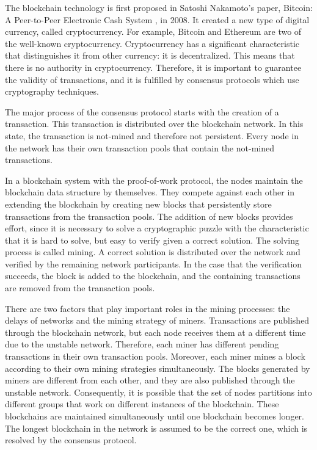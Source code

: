 The blockchain technology is first proposed in Satoshi Nakamoto’s paper, Bitcoin: A Peer-to-Peer Electronic Cash System \cite{Nakamoto2008}, in 2008. It created a new type of digital currency, called cryptocurrency. For example, Bitcoin \cite{bitcoin} and Ethereum \cite{ethereum} are two of the well-known cryptocurrency. Cryptocurrency has a significant characteristic that distinguishes it from other currency: it is decentralized. This means that there is no authority in cryptocurrency. Therefore, it is important to guarantee the validity of transactions, and it is fulfilled by consensus protocols which use cryptography techniques. \cite{Narayanan2016}

The major process of the consensus protocol starts with the creation of a transaction. This transaction is distributed over the blockchain network. In this state, the transaction is not-mined and therefore not persistent. Every node in the network has their own transaction pools that contain the not-mined transactions.

In a blockchain system with the proof-of-work protocol, the nodes maintain the blockchain data structure by themselves. They compete against each other in extending the blockchain by creating new blocks that persistently store transactions from the transaction pools. The addition of new blocks provides effort, since it is necessary to solve a cryptographic puzzle with the characteristic that it is hard to solve, but easy to verify given a correct solution. The solving process is called mining. A correct solution is distributed over the network and verified by the remaining network participants. In the case that the verification succeeds, the block is added to the blockchain, and the containing transactions are removed from the transaction pools.

There are two factors that play important roles in the mining processes: the delays of networks and the mining strategy of miners. Transactions are published through the blockchain network, but each node receives them at a different time due to the unstable network. Therefore, each miner has different pending transactions in their own transaction pools. Moreover, each miner mines a block according to their own mining strategies simultaneously. The blocks generated by miners are different from each other, and they are also published through the unstable network. Consequently, it is possible that the set of nodes partitions into different groups that work on different instances of the blockchain. These blockchains are maintained simultaneously until one blockchain becomes longer. The longest blockchain in the network is assumed to be the correct one, which is resolved by the consensus protocol.

